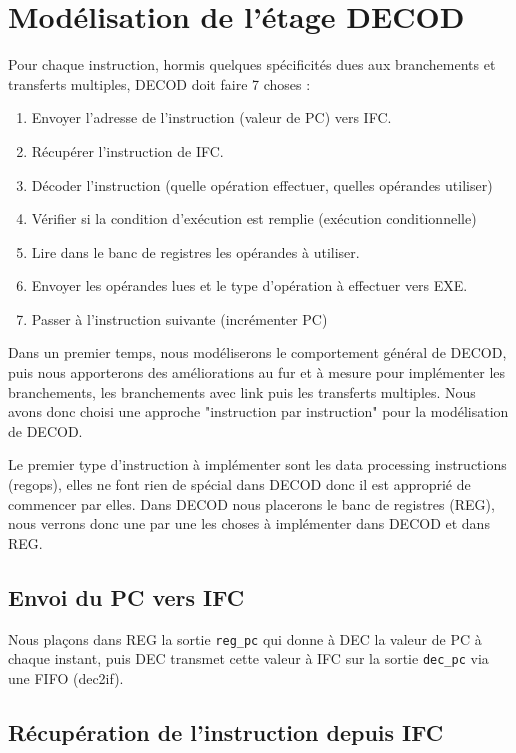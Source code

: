 \documentclass{article}
\begin{document}
\section{Modélisation de l'étage DECOD}

Pour chaque instruction, hormis quelques spécificités dues aux branchements
et transferts multiples, DECOD doit faire 7 choses :
\begin{enumerate}
  \item Envoyer l'adresse de l'instruction (valeur de PC) vers IFC.
  \item Récupérer l'instruction de IFC.
  \item Décoder l'instruction (quelle opération effectuer, quelles opérandes utiliser)
  \item Vérifier si la condition d'exécution est remplie (exécution conditionnelle)
  \item Lire dans le banc de registres les opérandes à utiliser.
  \item Envoyer les opérandes lues et le type d'opération à effectuer vers EXE.
  \item Passer à l'instruction suivante (incrémenter PC)
\end{enumerate}

Dans un premier temps, nous modéliserons le comportement général de DECOD,
puis nous apporterons des améliorations au fur et à mesure pour implémenter les branchements,
les branchements avec link puis les transferts multiples. Nous avons donc choisi une approche
"instruction par instruction" pour la modélisation de DECOD.

Le premier type d'instruction à implémenter sont les data processing instructions (regops),
elles ne font rien de spécial
dans DECOD donc il est approprié de commencer par elles.
Dans DECOD nous placerons le banc de registres (REG), nous verrons donc une par une les choses
à implémenter dans DECOD et dans REG.

\subsection{Envoi du PC vers IFC}

Nous plaçons dans REG la sortie \texttt{reg\_pc} qui donne à DEC la valeur de PC à chaque instant,
puis DEC transmet cette valeur à IFC sur la sortie \texttt{dec\_pc} via une FIFO (dec2if).

\subsection{Récupération de l'instruction depuis IFC}
\end{document}
